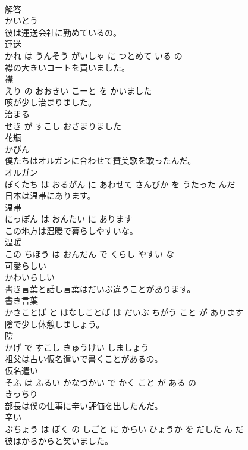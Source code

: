 \documentclass[8pt]{extreport}
\begin{document}
\begin{CJK}{UTF8}{min}
\\	解答	
\\	かいとう			
\\	彼は運送会社に勤めているの。	
\\	運送 
\\	かれ は うんそう がいしゃ に つとめて いる の			
\\	襟の大きいコートを買いました。	
\\	襟 
\\	えり の おおきい こーと を かいました			
\\	咳が少し治まりました。	
\\	治まる 
\\	せき が すこし おさまりました			
\\	花瓶	
\\	かびん			
\\	僕たちはオルガンに合わせて賛美歌を歌ったんだ。	
\\	オルガン 
\\	ぼくたち は おるがん に あわせて さんびか を うたった んだ			
\\	日本は温帯にあります。	
\\	温帯 
\\	にっぽん は おんたい に あります			
\\	この地方は温暖で暮らしやすいな。	
\\	温暖 
\\	この ちほう は おんだん で くらし やすい な			
\\	可愛らしい	
\\	かわいらしい			
\\	書き言葉と話し言葉はだいぶ違うことがあります。	
\\	書き言葉 
\\	かきことば と はなしことば は だいぶ ちがう こと が あります			
\\	陰で少し休憩しましょう。	
\\	陰 
\\	かげ で すこし きゅうけい しましょう			
\\	祖父は古い仮名遣いで書くことがあるの。	
\\	仮名遣い 
\\	そふ は ふるい かなづかい で かく こと が ある の			
\\	きっちり	
\\	部長は僕の仕事に辛い評価を出したんだ。	
\\	辛い 
\\	ぶちょう は ぼく の しごと に からい ひょうか を だした ん だ			
\\	彼はからからと笑いました。	

\end{CJK}
\end{document}
